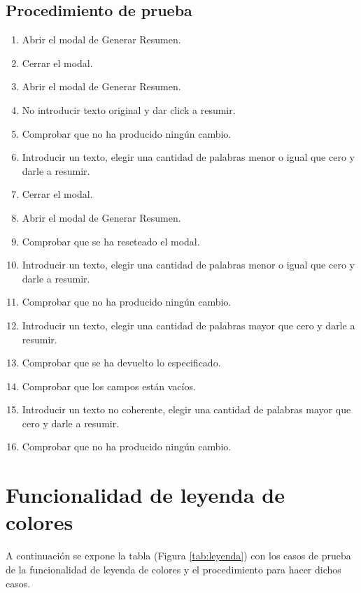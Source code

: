 \subsection{Procedimiento de prueba}
\label{procedimientoPruebas:resumen}
\begin{enumerate}
    \item Abrir el modal de Generar Resumen.
    \item Cerrar el modal.
    \item Abrir el modal de Generar Resumen.
    \item No introducir texto original y dar click a resumir.
    \item Comprobar que no ha producido ningún cambio.
    \item Introducir un texto, elegir una cantidad de palabras menor o igual que cero y darle a resumir.
    \item Cerrar el modal.
    \item Abrir el modal de Generar Resumen.
    \item Comprobar que se ha reseteado el modal.
    \item Introducir un texto, elegir una cantidad de palabras menor o igual que cero y darle a resumir.
    \item Comprobar que no ha producido ningún cambio.
    \item Introducir un texto, elegir una cantidad de palabras mayor que cero y darle a resumir.
    \item Comprobar que se ha devuelto lo especificado.
    \item Comprobar que los campos están vacíos.
    \item Introducir un texto no coherente, elegir una cantidad de palabras mayor que cero y darle a resumir.
    \item Comprobar que no ha producido ningún cambio.

\end{enumerate}


\section{Funcionalidad de leyenda de colores}
\label{planPruebas:leyenda}
A continuación se expone la tabla (Figura \ref{tab:leyenda}) con los casos de prueba de la funcionalidad de leyenda de colores y el procedimiento para hacer dichos casos.

